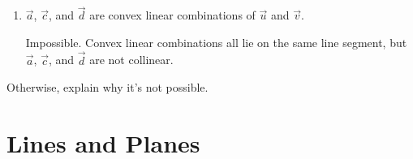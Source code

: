 \documentclass{problemset}
\newcommand{\displayonlynewpage}{\begin{displayonly}\newpage\end{displayonly}}
\newcommand{\bookonlynewpage}{\begin{bookonly}\newpage\end{bookonly}}
\begin{document}
\begin{parts}
\begin{enumerate}
				\item $\vec a$, $\vec c$, and $\vec d$ are convex linear
					combinations of $\vec u$ and $\vec v$.
				\begin{solution}
					Impossible. Convex linear combinations all lie on the same line segment,
					but $\vec a$, $\vec c$, and $\vec d$ are not collinear.
				\end{solution}
			\end{enumerate}Otherwise, explain why it's not possible.
	\end{parts}

	\displayonlynewpage
	\bookonlynewpage
\section*{Lines and Planes}
\end{document}
